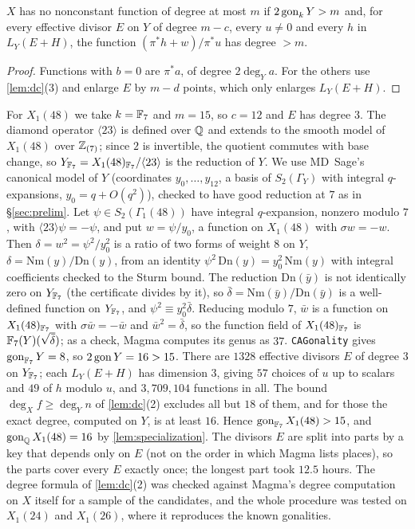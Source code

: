 \begin{proposition}\label{prop:dc}
$X$ has no nonconstant function of degree at most $m$ if $2\operatorname{gon}_k Y>m$ and, for every effective divisor $E$ on $Y$
of degree $m-c$, every $u\ne0$ and every $h$ in $L_Y(E+H)$, the function $(\pi^*h+w)/\pi^*u$ has degree $>m$.
\end{proposition}
\begin{proof}
Functions with $b=0$ are $\pi^*a$, of degree $2\deg_Ya$. For the others use \cref{lem:dc}(3) and enlarge $E$
by $m-d$ points, which only enlarges $L_Y(E+H)$.
\end{proof}

For $X_1(48)$ we take $k=\mathbb{F}_7$ and $m=15$, so $c=12$ and $E$ has degree $3$. The diamond operator $\langle23\rangle$
is defined over $\mathbb{Q}$ and extends to the smooth model of $X_1(48)$ over $\mathbb{Z}_{(7)}$; since $2$ is invertible, the
quotient commutes with base change, so $Y_{\mathbb{F}_7}=X_1(48)_{\mathbb{F}_7}/\langle23\rangle$ is the reduction of $Y$. We use
MD~Sage's canonical model of $Y$ (coordinates $y_0,\dots,y_{12}$, a basis of $S_2(\Gamma_Y)$ with integral
$q$-expansions, $y_0=q+O(q^2)$), checked to have good reduction at $7$ as in \S\ref{sec:prelim}. Let
$\psi\in S_2(\Gamma_1(48))$ have integral $q$-expansion, nonzero modulo $7$, with $\langle23\rangle\psi=-\psi$, and put
$w=\psi/y_0$, a function on $X_1(48)$ with $\sigma w=-w$. Then $\delta=w^2=\psi^2/y_0^2$ is a ratio of two forms of
weight $8$ on $Y$, $\delta=\mathrm{Nm}(y)/\mathrm{Dn}(y)$, from an identity $\psi^2\,\mathrm{Dn}(y)=y_0^2\,\mathrm{Nm}(y)$
with integral coefficients checked to the Sturm bound. The reduction $\mathrm{Dn}(\bar y)$ is not identically zero on
$Y_{\mathbb{F}_7}$ (the certificate divides by it), so $\bar\delta=\mathrm{Nm}(\bar y)/\mathrm{Dn}(\bar y)$ is a well-defined
function on $Y_{\mathbb{F}_7}$, and $\psi^2\equiv y_0^2\bar\delta$. Reducing modulo $7$, $\bar w$ is a function on
$X_1(48)_{\mathbb{F}_7}$ with $\sigma\bar w=-\bar w$ and $\bar w^2=\bar\delta$, so the function field of $X_1(48)_{\mathbb{F}_7}$ is
$\mathbb{F}_7(Y)(\sqrt{\bar\delta})$; as a check, Magma computes its genus as $37$. \texttt{CAGonality} gives
$\operatorname{gon}_{\mathbb{F}_7}Y=8$, so $2\operatorname{gon} Y=16>15$. There are $1328$ effective divisors $E$ of degree $3$ on $Y_{\mathbb{F}_7}$; each
$L_Y(E+H)$ has dimension $3$, giving $57$ choices of $u$ up to scalars and $49$ of $h$ modulo $u$, and
$3{,}709{,}104$ functions in all. The bound $\deg_Xf\ge\deg_Yn$ of \cref{lem:dc}(2) excludes all but $18$ of
them, and for those the exact degree, computed on $Y$, is at least $16$. Hence $\operatorname{gon}_{\mathbb{F}_7}X_1(48)>15$, and
$\operatorname{gon}_{\mathbb{Q}} X_1(48)=16$ by \cref{lem:specialization}. The divisors $E$ are split into parts by a key that depends only on $E$ (not on the order in which Magma lists
places), so the parts cover every $E$ exactly once; the longest part took $12.5$ hours. The
degree formula of \cref{lem:dc}(2) was checked against Magma's degree computation on $X$ itself for a sample of
the candidates, and the whole procedure was tested on $X_1(24)$ and $X_1(26)$, where it reproduces the known
gonalities.
